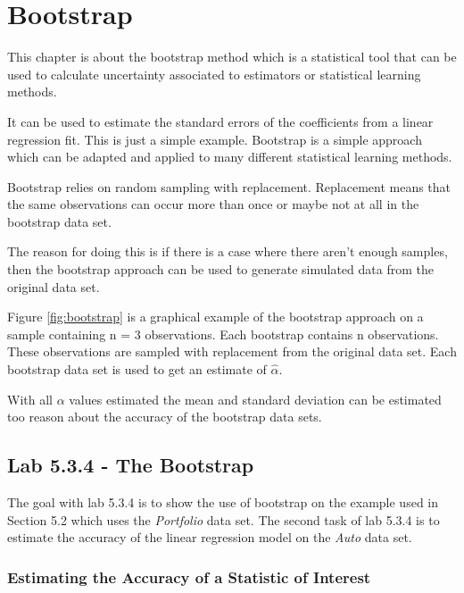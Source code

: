\chapter{Bootstrap}
\label{chp:boots}

This chapter is about the bootstrap method which is a statistical tool that can be used to calculate uncertainty associated to estimators or statistical learning methods.

It can be used to estimate the standard errors of the coefficients from a linear regression fit. This is just a simple example. Bootstrap is a simple approach which can be adapted and applied to many different statistical learning methods.

Bootstrap relies on random sampling with replacement. Replacement means that the same observations can occur more than once or maybe not at all in the bootstrap data set.

The reason for doing this is if there is a case where there aren't enough samples, then the bootstrap approach can be used to generate simulated data from the original data set.


Figure \ref{fig:bootstrap} is a graphical example of the bootstrap approach on a sample containing n = 3 observations. Each bootstrap contains n observations. These observations are sampled with replacement from the original data set. Each bootstrap data set is used to get an estimate of $\hat{\alpha}$.

With all $\alpha$ values estimated the mean and standard deviation can be estimated too reason about the accuracy of the bootstrap data sets.

\section{Lab 5.3.4 - The Bootstrap}

The goal with lab 5.3.4 is to show the use of bootstrap on the example used in Section 5.2\citep{ISLR} which uses the \emph{Portfolio} data set. The second task of lab 5.3.4 is to estimate the accuracy of the linear regression model on the \emph{Auto} data set.

\subsection{Estimating the Accuracy of a Statistic of Interest}

